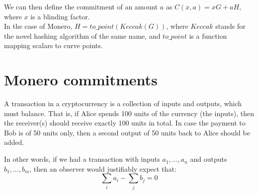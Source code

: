 We can then define the commitment of an amount \(a\) as \(C(x, a) = x G + a H\), where \(x\) is a blinding factor. 
\\

In the case of Monero, \(H = to\_point(\mathit{Keccak}(G))\), where \(\mathit{Keccak}\) stands for the novel hashing algorithm of the same name, and \(to\_point\) is a function mapping scalars to curve points.  



%
%
%
%
%
%
\section{Monero commitments}
\label{sec:pedersen_monero}

A transaction in a cryptocurrency is a collection of inputs and outputs, which must balance. That is, if Alice spends 100 units of the currency (the inputs), then the receiver(s) should receive exactly 100 units in total. In case the payment to Bob is of 50 units only, then a second output of 50 units back to Alice should be added. 

In other words, if we had a transaction with inputs \(a_1, ..., a_n\) and outputs \(b_1, ..., b_m\), then an
observer would justifiably expect that: 
\[\sum_i a_i - \sum_j b_j = 0\]

